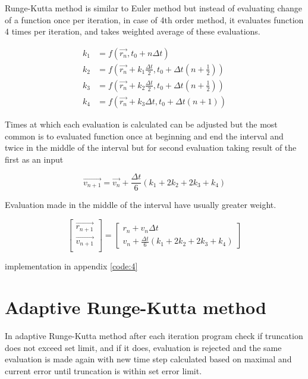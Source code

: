 \documentclass[english,12pt,a4paper, notitlepage]{report}
\begin{document}
	Runge-Kutta method is similar to Euler method but instead of evaluating change of a function once per iteration, in case of 4th order method, it evaluates function 4 times per iteration, and takes weighted average of these evaluations.
	
	\begin{equation}\label{eq:RK4}
		\begin{split}
			k_1 &= f(\vec{r_n},  t_0 + n \Delta t)\\
			k_2 &= f\left(\vec{r_n} + k_1 \frac{\Delta t}{2}, t_0 + \Delta t(n + \frac{1}{2})\right)\\
			k_3 &= f\left(\vec{r_n} + k_2 \frac{\Delta t}{2}, t_0 + \Delta t(n + \frac{1}{2})\right)\\
			k_4 &= f\left(\vec{r_n} + k_3 \Delta t, t_0 + \Delta t(n + 1)\right)
		\end{split}
	\end{equation}
	
	Times at which each evaluation is calculated can be adjusted but the most common is to evaluated function once at beginning and end the interval and twice in the middle of the interval but for second evaluation taking result of the first as an input
	
	\begin{equation}
		\vec{v_{n+1}} = \vec{v_n} + \frac{\Delta t}{6}(k_1 + 2 k_2 + 2k_3 + k_4)
	\end{equation}
	
	Evaluation made in the middle of the interval have usually greater weight.	
	
	\begin{equation}
		\begin{bmatrix}
			\vec{r_{n+1}}\\
			\vec{v_{n+1}}\\
		\end{bmatrix}
		=
		\begin{bmatrix}
			r_n + v_n \Delta t\\
			v_n + \frac{\Delta t}{6}(k_1 + 2 k_2 + 2k_3 + k_4)
		\end{bmatrix}
	\end{equation}
	
	implementation in appendix \ref{code:4}
	
	\section{Adaptive Runge-Kutta method}
	
	In adaptive Runge-Kutta method after each iteration program check if truncation does not exceed set limit, and if it does, evaluation is rejected and the same evaluation is made again with new time step calculated based on maximal and current error until truncation is within set error limit.
	
\end{document}
